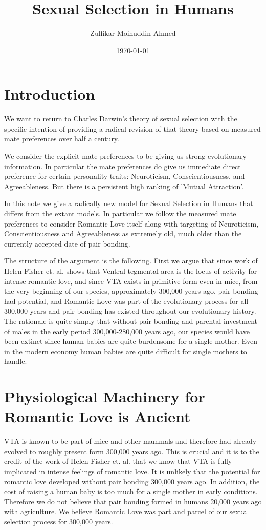 \documentclass{article}
\title{Sexual Selection in Humans}
\author{Zulfikar Moinuddin Ahmed}
\date{\today}
\begin{document}
\maketitle

\section{Introduction}
We want to return to Charles Darwin's theory of sexual selection with the specific intention of providing a radical revision of that theory based on measured mate preferences over half a century.

We consider the explicit mate preferences to be giving us strong evolutionary information. In particular the mate preferences do give us immediate direct preference for certain personality traits: Neuroticism, Conscientiousness, and Agreeableness.  But there is a persistent high ranking of 'Mutual Attraction'.  

In this note we give a radically new model for Sexual Selection in Humans that differs from the extant models.  In particular we follow the measured mate preferences to consider Romantic Love itself along with targeting of Neuroticism, Conscientiousness and Agreeableness as extremely old, much older than the currently accepted date of pair bonding.

The structure of the argument is the following.  First we argue that since work of Helen Fisher et. al. shows that Ventral tegmental area is the locus of activity for intense romantic love, and since VTA exists in primitive form even in mice, from the very beginning of our species, approximately 300,000 years ago, pair bonding had potential, and Romantic Love was part of the evolutionary process for all 300,000 years and pair bonding has existed throughout our evolutionary history.  The rationale is quite simply that without pair bonding and parental investment of males in the early period 300,000-280,000 years ago, our species would have been extinct since human babies are quite burdensome for a single mother.  Even in the modern economy human babies are quite difficult for single mothers to handle.

\section{Physiological Machinery for Romantic Love is Ancient}

VTA is known to be part of mice and other mammals and therefore had already evolved to roughly present form 300,000 years ago. This is crucial and it is to the credit of the work of Helen Fisher et. al. that we know that VTA is fully implicated in intense feelings of romantic love.  It is unlikely that the potential for romantic love developed without pair bonding 300,000 years ago.  In addition, the cost of raising a human baby is too much for a single mother in early conditions.  Therefore we do not believe that pair bonding formed in humans 20,000 years ago with agriculture.  We believe Romantic Love was part and parcel of our sexual selection process for 300,000 years.
\end{document}
